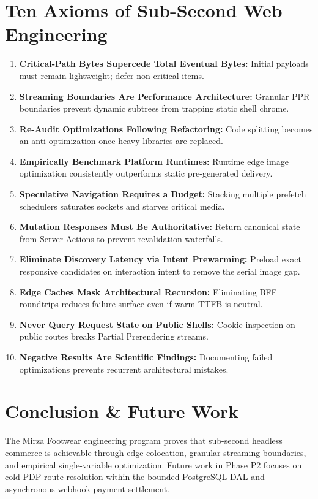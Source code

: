 \documentclass[conference]{IEEEtran}
\begin{document}
\section{Ten Axioms of Sub-Second Web Engineering}
\begin{enumerate}
    \item \textbf{Critical-Path Bytes Supercede Total Eventual Bytes:} Initial payloads must remain lightweight; defer non-critical items.
    \item \textbf{Streaming Boundaries Are Performance Architecture:} Granular PPR boundaries prevent dynamic subtrees from trapping static shell chrome.
    \item \textbf{Re-Audit Optimizations Following Refactoring:} Code splitting becomes an anti-optimization once heavy libraries are replaced.
    \item \textbf{Empirically Benchmark Platform Runtimes:} Runtime edge image optimization consistently outperforms static pre-generated delivery.
    \item \textbf{Speculative Navigation Requires a Budget:} Stacking multiple prefetch schedulers saturates sockets and starves critical media.
    \item \textbf{Mutation Responses Must Be Authoritative:} Return canonical state from Server Actions to prevent revalidation waterfalls.
    \item \textbf{Eliminate Discovery Latency via Intent Prewarming:} Preload exact responsive candidates on interaction intent to remove the serial image gap.
    \item \textbf{Edge Caches Mask Architectural Recursion:} Eliminating BFF roundtrips reduces failure surface even if warm TTFB is neutral.
    \item \textbf{Never Query Request State on Public Shells:} Cookie inspection on public routes breaks Partial Prerendering streams.
    \item \textbf{Negative Results Are Scientific Findings:} Documenting failed optimizations prevents recurrent architectural mistakes.
\end{enumerate}

\section{Conclusion \& Future Work}
The Mirza Footwear engineering program proves that sub-second headless commerce is achievable through edge colocation, granular streaming boundaries, and empirical single-variable optimization. Future work in Phase P2 focuses on cold PDP route resolution within the bounded PostgreSQL DAL and asynchronous webhook payment settlement.

\balance


\end{document}
